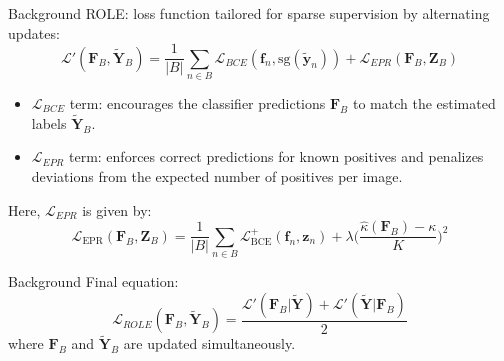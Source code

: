 \begin{frame}{Background}
   ROLE: loss function tailored for sparse supervision by alternating updates:
  \[
    \mathcal{L}'(\mathbf{F}_B,\tilde{\mathbf{Y}}_B) = \frac{1}{|B|}\sum_{n\in B} \mathcal{L}_{BCE}(\mathbf{f}_n,\text{sg}(\tilde{\mathbf{y}}_n)) + \mathcal{L}_{EPR}(\mathbf{F}_B,\mathbf{Z}_B)
  \]
  \begin{itemize}
    \item $\mathcal{L}_{BCE}$ term: encourages the classifier predictions $\mathbf{F}_B$ to match the estimated labels $\tilde{\mathbf{Y}}_B$.
    \item  $\mathcal{L}_{EPR}$ term: enforces correct predictions for known positives and penalizes deviations from the expected number of positives per image.
  \end{itemize}
  Here, $\mathcal{L}_{EPR}$ is given by:
  \[
    \mathcal{L}_{\text{EPR}}(\mathbf{F}_B,\mathbf{Z}_B) = \frac{1}{|B|}\sum_{n\in B} \mathcal{L}_{\text{BCE}}^{+}(\mathbf{f}_n,\mathbf{z}_n) + \lambda\bigl(\frac{\hat{\kappa}(\mathbf{F}_B) - \kappa}{K}\bigr)^2
  \]
\end{frame}

\begin{frame}{Background}
  Final equation:
  \begin{equation*}
    \mathcal{L}_{ROLE}(\mathbf{F}_B, \mathbf{\tilde{Y}}_B) = \frac{\mathcal{L}'(\mathbf{F}_B|\mathbf{\tilde{Y}})+\mathcal{L}'(\mathbf{\tilde{Y}}|\mathbf{F}_B)}{2}
  \end{equation*}
  where $\mathbf{F}_B$ and $\tilde{\mathbf{Y}}_B$ are updated simultaneously.
\end{frame}




